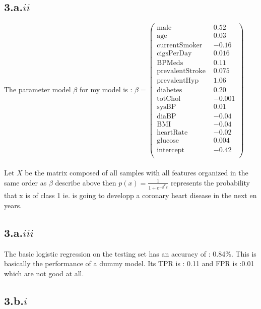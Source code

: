 \documentclass{article}
\begin{document}
    \subsection*{3.a.$ii$}
    The parameter model $\beta$ for my model is : $\beta = 
    \left(
    \begin{array}{lr}
        \text{male } & 0.52 \\
        \text{age } & 0.03 \\
        \text{currentSmoker } & -0.16 \\
        \text{cigsPerDay } & 0.016 \\
        \text{BPMeds } & 0.11 \\
        \text{prevalentStroke } & 0.075 \\
        \text{prevalentHyp } & 1.06 \\
        \text{diabetes } & 0.20 \\
        \text{totChol } & -0.001 \\
        \text{sysBP } & 0.01 \\
        \text{diaBP } & -0.04 \\
        \text{BMI } & -0.04 \\
        \text{heartRate } & -0.02 \\
        \text{glucose } & 0.004 \\
        \text{intercept } & -0.42 \\
    \end{array}
    \right)$
    \\\\
    Let $X$ be the matrix composed of all samples with all features organized in the same order as $\beta$ describe above then
    $p(x) = \frac{1}{1+e^{-\beta^T x}}$ represents the probability that x is of class 1 ie. is going to developp a coronary heart disease in the next en years.
    \\

    \subsection*{3.a.$iii$}
    The basic logistic regression on the testing set has an accuracy of : 0.84\%. This is basically the performance of a dummy model.
    Its TPR is : 0.11 and FPR is :0.01 which are not good at all.

    \subsection*{3.b.$i$}
    
\end{document}
